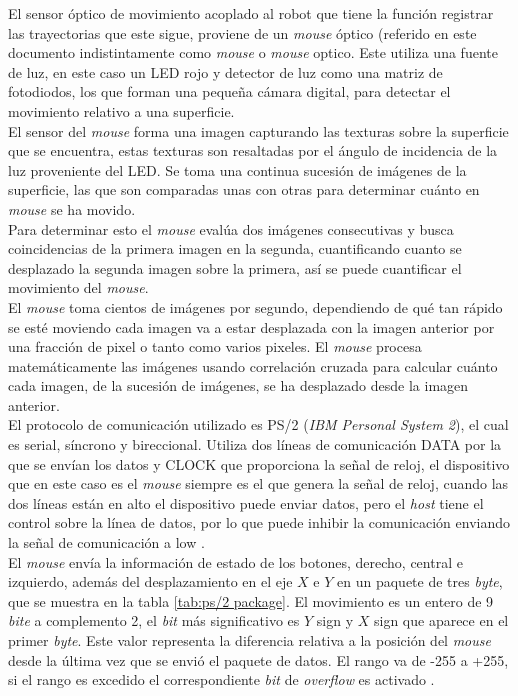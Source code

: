 \documentclass{iccmemoria}
\begin{document}
El sensor óptico de movimiento acoplado al robot que tiene la función registrar las trayectorias que este sigue, proviene de un \emph{mouse} óptico (referido en este documento indistintamente como \emph{mouse} o \emph{mouse} optico. Este utiliza una fuente de luz, en este caso un LED rojo y detector de luz como una matriz de fotodiodos, los que forman una pequeña cámara digital, para detectar el movimiento relativo a una superficie.\\

El sensor del \emph{mouse} forma una imagen capturando las texturas sobre la superficie que se encuentra, estas texturas son resaltadas por el ángulo de incidencia de la luz proveniente del LED. Se toma una continua sucesión de imágenes de la superficie, las que son comparadas unas con otras para determinar cuánto en \emph{mouse} se ha movido.\\

Para determinar esto el \emph{mouse} evalúa dos imágenes consecutivas y busca coincidencias de la primera imagen en la segunda, cuantificando cuanto se desplazado la segunda imagen sobre la primera, así se puede cuantificar el movimiento del \emph{mouse}.\\

El \emph{mouse} toma cientos de imágenes por segundo, dependiendo de qué tan rápido se esté moviendo cada imagen va a estar desplazada con la imagen anterior por una fracción de pixel o tanto como varios pixeles. El \emph{mouse} procesa matemáticamente las imágenes usando correlación cruzada para calcular cuánto cada imagen, de la sucesión de imágenes, se ha desplazado desde la imagen anterior.\\

El protocolo de comunicación utilizado es PS/2 (\emph{IBM Personal System 2}), el cual es serial, síncrono y bireccional. Utiliza dos líneas de comunicación DATA por la que se envían los datos y CLOCK que proporciona la señal de reloj, el dispositivo que en este caso es el \emph{mouse} siempre es el que genera la señal de reloj, cuando las dos líneas están en alto el dispositivo puede enviar datos, pero el \emph{host} tiene el control sobre la línea de datos, por lo que puede inhibir la comunicación enviando la señal de comunicación a low \cite{ps2protocol}.\\

El \emph{mouse} envía la información de estado de los botones, derecho, central e izquierdo, además del desplazamiento en el eje $X$ e $Y$ en un paquete de tres \emph{byte}, que se muestra en la tabla \ref{tab:ps/2 package}. El movimiento es un entero de 9 \emph{bite} a complemento 2, el \emph{bit} más significativo es $Y$ sign y $X$ sign que aparece en el primer \emph{byte}. Este valor representa la diferencia relativa a la posición del \emph{mouse} desde la última vez que se envió el paquete de datos. El rango va de -255 a +255, si el rango es excedido el correspondiente \emph{bit} de \emph{overflow} es activado \cite{ps2mouse}.\\
\end{document}
